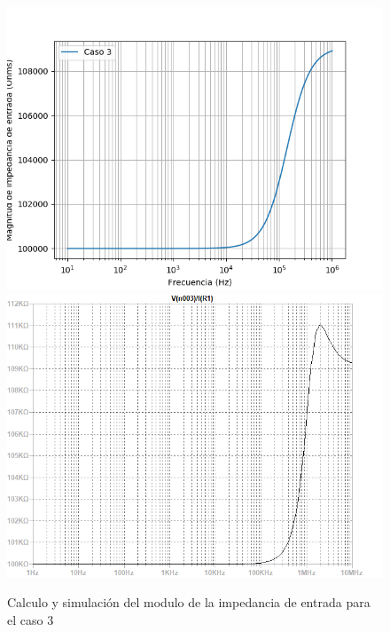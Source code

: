 \begin{figure}[H]
\begin{centering}
\includegraphics[scale=0.5]{../Ex1/iA/Resources1a/zinpm3}\includegraphics[scale=0.4]{../Ex1/iA/Resources1a/zinpm3_sim}
\par\end{centering}
\caption{Calculo y simulación del modulo de la impedancia de entrada para el
caso 3}
\end{figure}

